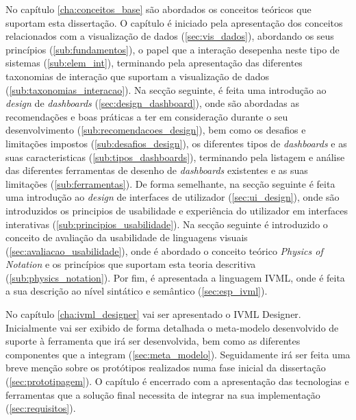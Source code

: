 No capítulo \ref{cha:conceitos_base} são abordados os conceitos teóricos que suportam esta dissertação. O capítulo é iniciado pela apresentação dos conceitos relacionados com a visualização de dados (\ref{sec:vis_dados}), abordando os seus princípios (\ref{sub:fundamentos}), o papel que a interação desepenha neste tipo de sistemas (\ref{sub:elem_int}), terminando pela apresentação das diferentes taxonomias de interação que suportam a visualização de dados (\ref{sub:taxonomias_interacao}). Na secção seguinte, é feita uma introdução ao \textit{design} de \textit{dashboards} (\ref{sec:design_dashboard}), onde são abordadas as recomendações e boas práticas a ter em consideração durante o seu desenvolvimento (\ref{sub:recomendacoes_design}), bem como os desafios e limitações impostos (\ref{sub:desafios_design}), os diferentes tipos de \textit{dashboards} e as suas caracteristicas (\ref{sub:tipos_dashboards}), terminando pela listagem e análise das diferentes ferramentas de desenho de \textit{dashboards} existentes e as suas limitações (\ref{sub:ferramentas}). De forma semelhante, na secção seguinte é feita uma introdução ao \textit{design} de interfaces de utilizador (\ref{sec:ui_design}), onde são introduzidos os principios de usabilidade e experiência do utilizador em interfaces interativas (\ref{sub:principios_usabilidade}). Na secção seguinte é introduzido o conceito de avaliação da usabilidade de linguagens visuais (\ref{sec:avaliacao_usabilidade}), onde é abordado o conceito teórico \textit{Physics of Notation} e os princípios que suportam esta teoria descritiva (\ref{sub:physics_notation}). Por fim, é apresentada a linguagem IVML, onde é feita a sua descrição ao nível sintático e semântico (\ref{sec:esp_ivml}).

No capítulo \ref{cha:ivml_designer} vai ser apresentado o IVML Designer. Inicialmente vai ser exibido de forma detalhada o meta-modelo desenvolvido de suporte à ferramenta que irá ser desenvolvida, bem como as diferentes componentes que a integram (\ref{sec:meta_modelo}). Seguidamente irá ser feita uma breve menção sobre os protótipos realizados numa fase inicial da dissertação (\ref{sec:prototipagem}). O capítulo é encerrado com a apresentação das tecnologias e ferramentas que a solução final necessita de integrar na sua implementação (\ref{sec:requisitos}).

